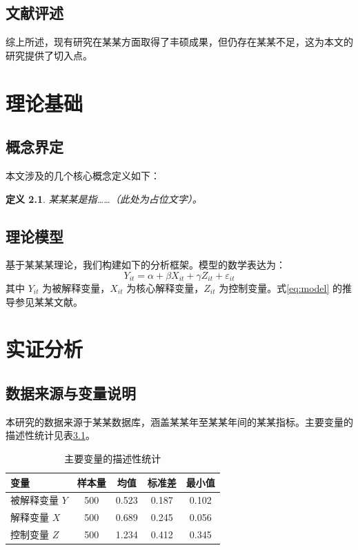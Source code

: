 \documentclass[12pt,openright]{book}
\newtheorem{Definition}{定义}[chapter]
\begin{document}
\section{文献评述}
综上所述，现有研究在某某方面取得了丰硕成果，但仍存在某某不足，这为本文的研究提供了切入点。

\chapter{理论基础}

\section{概念界定}
本文涉及的几个核心概念定义如下：
\begin{Definition}
某某某是指……（此处为占位文字）\cite{ref_standard_cn}。
\end{Definition}

\section{理论模型}
基于某某某理论，我们构建如下的分析框架。模型的数学表达为：
\begin{equation}\label{eq:model}
Y_{it} = \alpha + \beta X_{it} + \gamma Z_{it} + \varepsilon_{it}
\end{equation}
其中 $Y_{it}$ 为被解释变量，$X_{it}$ 为核心解释变量，$Z_{it}$ 为控制变量。式\eqref{eq:model} 的推导参见某某文献\cite{ref_patent_cn}。

\chapter{实证分析}

\section{数据来源与变量说明}
本研究的数据来源于某某数据库，涵盖某某年至某某年间的某某指标。主要变量的描述性统计见表\ref{tab:summary}。

\begin{table}[H]
\centering
\caption{主要变量的描述性统计}
\label{tab:summary}
\begin{tabular}{lcccc}
\toprule
变量    & 样本量 & 均值   & 标准差 & 最小值 \\
\midrule
被解释变量 $Y$ & 500 & 0.523 & 0.187 & 0.102 \\
解释变量 $X$   & 500 & 0.689 & 0.245 & 0.056 \\
控制变量 $Z$   & 500 & 1.234 & 0.412 & 0.345 \\
\bottomrule
\end{tabular}
\end{table}
\end{document}

